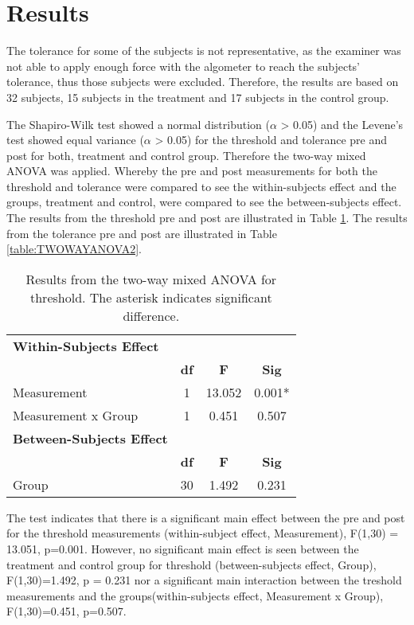 \section{Results}
The tolerance for some of the subjects is not representative, as the examiner was not able to apply enough force with the algometer to reach the subjects' tolerance, thus those subjects were excluded. Therefore,
the results are based on 32 subjects, 15 subjects in the treatment and 17 subjects in the control group. 

The Shapiro-Wilk test showed a normal distribution ($\alpha$ > 0.05) and the Levene's test showed equal variance ($\alpha$ > 0.05) for the threshold and tolerance pre and post for both, treatment and control group. Therefore the two-way mixed ANOVA was applied. Whereby the pre and post measurements for both the threshold and tolerance were compared to see the within-subjects effect and the groups, treatment and control, were compared to see the between-subjects effect. The results from the threshold pre and post are illustrated in Table \ref{table:TWOWAYANOVA1}.   The results from the tolerance pre and post are illustrated in Table \ref{table:TWOWAYANOVA2}. 

\begin{table}[ht]
\caption{Results from the two-way mixed ANOVA for threshold. The asterisk indicates significant difference.}
\centering
\begin{tabular}{l c c c}
\hline \hline
\textbf{Within-Subjects Effect} \\
& \textbf{df} &\textbf{F} & \textbf{Sig} \\ [0.5ex] %
\hline
Measurement & 1 & 13.052 &  0.001* \\
Measurement x Group & 1 & 0.451 & 0.507 \\
\hline \hline
\textbf{Between-Subjects Effect}  \\
& \textbf{df} & \textbf{F} & \textbf{Sig} \\ [0.5ex] %
\hline
Group & 30 & 1.492 &  0.231 \\
\hline
\end{tabular}
\label{table:TWOWAYANOVA1}
\end{table}

\noindent
The test indicates that there is a significant main effect between the pre and post for the threshold measurements (within-subject effect, Measurement), F(1,30) = 13.051, p=0.001. However, no significant main effect is seen between the treatment and control group for threshold (between-subjects effect, Group), F(1,30)=1.492, p = 0.231 nor a significant main interaction between the treshold measurements and the groups(within-subjects effect, Measurement x Group), F(1,30)=0.451, p=0.507.

